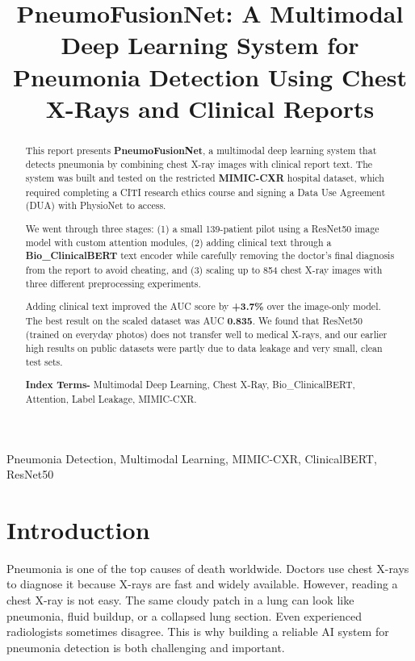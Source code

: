 \documentclass{article}
\title{PneumoFusionNet: A Multimodal Deep Learning System
for Pneumonia Detection Using Chest X-Rays and Clinical Reports}
\begin{document}
\ninept
\maketitle

\begin{abstract}
This report presents \textbf{PneumoFusionNet}, a multimodal deep learning system
that detects pneumonia by combining chest X-ray images with clinical report text.
The system was built and tested on the restricted \textbf{MIMIC-CXR} hospital
dataset, which required completing a CITI research ethics course and signing a
Data Use Agreement (DUA) with PhysioNet to access.

We went through three stages: (1) a small 139-patient pilot using a ResNet50
image model with custom attention modules, (2) adding clinical text through a
\textbf{Bio\_ClinicalBERT} text encoder while carefully removing the doctor's
final diagnosis from the report to avoid cheating, and (3) scaling up to 854
chest X-ray images with three different preprocessing experiments.

Adding clinical text improved the AUC score by \textbf{+3.7\%} over the
image-only model. The best result on the scaled dataset was AUC \textbf{0.835}.
We found that ResNet50 (trained on everyday photos) does not transfer well to
medical X-rays, and our earlier high results on public datasets were partly
due to data leakage and very small, clean test sets.

\textbf{Index Terms-} Multimodal Deep Learning, Chest X-Ray, Bio\_ClinicalBERT,
Attention, Label Leakage, MIMIC-CXR.
\end{abstract}

\begin{keywords}
Pneumonia Detection, Multimodal Learning, MIMIC-CXR, ClinicalBERT, ResNet50
\end{keywords}

\section{Introduction}

Pneumonia is one of the top causes of death worldwide. Doctors use chest X-rays
to diagnose it because X-rays are fast and widely available. However, reading a
chest X-ray is not easy. The same cloudy patch in a lung can look like pneumonia,
fluid buildup, or a collapsed lung section. Even experienced radiologists
sometimes disagree. This is why building a reliable AI system for pneumonia
detection is both challenging and important.
\end{document}
